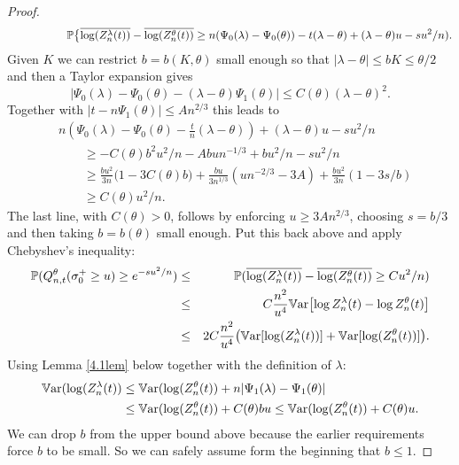 \documentclass[11pt]{amsart}
\numberwithin{equation}{section}
\theoremstyle{remark}
\providecommand{\abs}[1]{\vert#1\vert}
\begin{document}
\begin{proof}
\begin{eqnarray}{\nonumber}
{\nonumber}
&&\hskip15mm{\mathbb{P}}\bigl\{\overline{\log( Z_n^{\lambda}(t))}-\overline{\log( Z_n^{\theta}(t))}\ge
n({\Psi_0}(\lambda)-{\Psi_0}({\theta}))-{t}(\lambda-{\theta})+(\lambda-{\theta})u-su^2/n).  
\end{eqnarray}
Given $K$ we can restrict $b=b(K,{\theta})$ small enough so that 
$\abs{\lambda-{\theta}}\le bK\le {\theta}/2$ and then a 
  Taylor expansion gives 
\[
|{\Psi_0}(\lambda)-{\Psi_0}({\theta})-(\lambda-{\theta}) {\Psi_1}({\theta})|\le C({\theta}) (\lambda-{\theta})^2.  
\]
Together with $|t-n{\Psi_1}({\theta})|\le A n^{2/3}$ this leads to
\begin{align*}
&n({\Psi_0}(\lambda)-{\Psi_0}({\theta})-\frac{t}{n}(\lambda-{\theta}))+(\lambda-{\theta})u-su^2/n\\
&\qquad \ge
-C({\theta}) b^2 u^2/n-A b u n^{-1/3}+  b u^2/n-s u^2/n\\
&\qquad\ge \frac{bu^2}{3n} \bigl(1-3C({\theta})b\bigr)  +  \frac{bu}{3n^{1/3}}(un^{-2/3}-3A)   
 + \frac{bu^2}{3n}( 1-3s/b)  \\
&\qquad \ge C({\theta}) u^2/n.  
\end{align*}
The last line, with  $C({\theta})>0$,  follows  by enforcing $u\ge 3An^{2/3}$, 
  choosing $s=b/3$ and then taking $b=b({\theta})$ small enough. Put  this back above and apply Chebyshev's inequality:
\begin{eqnarray} {\nonumber}
{\mathbb{P}}(Q^{\theta}_{n,t}(\sigma_0^+\ge u)\ge e^{-su^2/n})&\le&{\mathbb{P}}(\overline{\log( Z_n^{\lambda}(t))}-\overline{\log( Z_n^{\theta}(t))}\ge C u^2/n)\\ {\nonumber}
 &\le& C \frac{n^2}{u^4}
{{\rm\mathbb{V}ar}}\bigl[\log Z_n^{\lambda}(t)-\log Z_n^{\theta}(t)\bigr]\\ \label{anotherUP}
&\le& 2C \frac{n^2}{u^4}\bigl({{\rm\mathbb{V}ar}}[\log( Z_n^{\lambda}(t))]+{{\rm\mathbb{V}ar}}[\log( Z_n^{\theta}(t))] \bigr).
\end{eqnarray}
{Using Lemma \ref{4.1lem} below together with  the definition of  $\lambda$:}
\begin{align*}
{{\rm\mathbb{V}ar}}(\log( Z_n^{\lambda}(t))&\le {{\rm\mathbb{V}ar}}(\log( Z_n^{\theta}(t)) + n\abs{{\Psi_1}(\lambda)-{\Psi_1}({\theta})}\\
&\le  {{\rm\mathbb{V}ar}}(\log( Z_n^{\theta}(t)) +  C({\theta}) bu  \le   {{\rm\mathbb{V}ar}}(\log( Z_n^{\theta}(t)) +  C({\theta}) u.
\end{align*}
We can drop $b$ from the upper bound above because the earlier requirements force
$b$ to be small. So we can safely assume  form the beginning that $b\le 1$.  


\end{proof}
\end{document}
